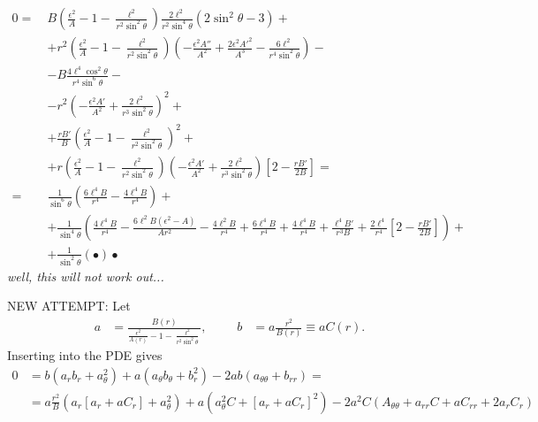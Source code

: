 \documentclass[english, parskip=full]{scrartcl}
\newcommand{\kla}{}
\newcommand{\klam}{}
\begin{document}
\begin{align*}
0 =\ & B \kla\left( \frac{\epsilon^2}{A} - 1 - \frac{\ell^2}{r^2\sin^2\theta} \right) \frac{2\ell^2}{r^2\sin^4\theta} \kla\left( 2\sin^2\theta - 3 \right) + \\
&+ r^2 \left( \frac{\epsilon^2}{A} - 1 - \frac{\ell^2}{r^2\sin^2\theta} \right) \kla\left( -\frac{\epsilon^2A''}{A^2} + \frac{2\epsilon^2 A'^2}{A^3} - \frac{6\ell^2}{r^4\sin^2\theta} \right) - \\
&- B \frac{4\ell^4\cos^2\theta}{r^4\sin^6\theta} - \\
&- r^2 \kla\left( -\frac{\epsilon^2A'}{A^2} + \frac{2\ell^2}{r^3\sin^2\theta} \right)^2 + \\
&+ \frac{rB'}{B} \kla\left( \frac{\epsilon^2}{A} - 1 - \frac{\ell^2}{r^2\sin^2\theta} \right)^2 + \\
&+ r \kla\left( \frac{\epsilon^2}{A} - 1 - \frac{\ell^2}{r^2\sin^2\theta} \right) \kla\left( -\frac{\epsilon^2A'}{A^2} + \frac{2\ell^2}{r^3\sin^2\theta} \right) \klam\left[ 2 - \frac{rB'}{2B} \right] = \\
=\ & \frac{1}{\sin^6\theta} \kla\left( \frac{6\ell^4B}{r^4} - \frac{4\ell^4B}{r^4}  \right) + \\
&+ \frac{1}{\sin^4\theta} \kla\left( \frac{4\ell^4B}{r^4}  - \frac{6\ell^2B (\epsilon^2-A)}{Ar^2} - \frac{4\ell^2B}{r^4} + \frac{6\ell^4B}{r^4} + \frac{4\ell^4B}{r^4} + \frac{\ell^4B'}{r^3B} + \frac{2\ell^4}{r^4} \klam\left[ 2 - \frac{rB'}{2B} \right] \right) + \\
&+ \frac{1}{\sin^2\theta} \kla\left( • \right)•
\end{align*}
\emph{well, this will not work out...}


NEW ATTEMPT:
Let
\begin{align}
a &= \frac{B(r)}{\frac{\epsilon^2}{A(r)} - 1 - \frac{\ell^2}{r^2\sin^2\theta}}, &&& b &= a\frac{r^2}{B(r)} \equiv aC(r).
\end{align}
Inserting into the PDE gives
\begin{align}
0 &= b (a_rb_r + a_\theta^2) + a(a_\theta b_\theta + b_r^2) - 2ab(a_{\theta\theta} + b_{rr}) = \\
&= a\frac{r^2}{B} \kla\left( a_r \klam\left[ a_r + aC_r \right] + a_\theta^2 \right) + a\kla\left( a_\theta^2C + \klam\left[ a_r + aC_r \right]^2 \right) - 2a^2C\kla\left( A_{\theta\theta} + a_{rr}C + aC_{rr} + 2a_rC_r \right)
\end{align}
\end{document}
